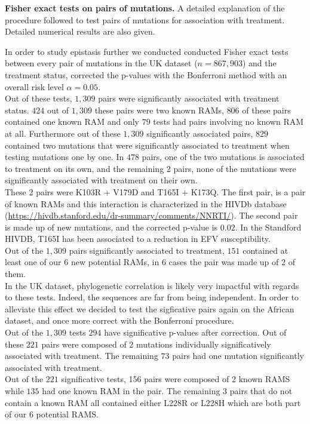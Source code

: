 \documentclass[
  11pt,
  twoside]{scrbook}
\begin{document}
\textbf{Fisher exact tests on pairs of mutations.} A detailed explanation of the procedure followed to test pairs of mutations for association with treatment. Detailed numerical results are also given.

In order to study epistasis further we conducted conducted Fisher exact tests between every pair of mutations in the UK dataset (\(n=867,903\)) and the treatment status, corrected the p-values with the Bonferroni method with an overall risk level \(\alpha=0.05\).\\
Out of these tests, \(1,309\) pairs were significantly associated with treatment status. \(424\) out of \(1,309\) these pairs were two known RAMs, \(806\) of these pairs contained one known RAM and only \(79\) tests had pairs involving no known RAM at all. Furthermore out of these \(1,309\) significantly associated pairs, \(829\) contained two mutations that were significantly associated to treatment when testing mutations one by one. In \(478\) pairs, one of the two mutations is associated to treatment on its own, and the remaining 2 pairs, none of the mutations were significantly associated with treatment on their own.\\
These 2 pairs were K103R + V179D and T165I + K173Q. The first pair, is a pair of known RAMs and this interaction is characterized in the HIVDb database (\url{https://hivdb.stanford.edu/dr-summary/comments/NNRTI/}). The second pair is made up of new mutations, and the corrected p-value is \(0.02\). In the Standford HIVDB, T165I has been associated to a reduction in EFV susceptibility.\\
Out of the \(1,309\) pairs significantly associated to treatment, \(151\) contained at least one of our 6 new potential RAMs, in \(6\) cases the pair was made up of 2 of them.\\
In the UK dataset, phylogenetic correlation is likely very impactful with regards to these tests. Indeed, the sequences are far from being independent. In order to alleviate this effect we decided to test the sigficative pairs again on the African dataset, and once more correct with the Bonferroni procedure.\\
Out of the \(1,309\) tests \(294\) have significative p-values after correction. Out of these \(221\) pairs were composed of 2 mutations individually significatively associated with treatment. The remaining \(73\) pairs had one mutation significantly associated with treatment.\\
Out of the \(221\) significative tests, 156 pairs were composed of 2 known RAMS while \(135\) had one known RAM in the pair. The remaining 3 pairs that do not contain a known RAM all contained either L228R or L228H which are both part of our 6 potential RAMS.
\end{document}
